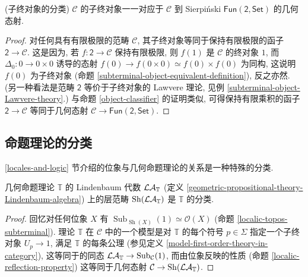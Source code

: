 
\begin{prop}
	[label={subterminal-classifying-topos}]
	{(子终对象的分类\topos{})}
	\topos{} $\mathcal C$ 的子终对象一一对应于 $\mathcal C$ 到 Sierpi\'nski \topos{} $\mathsf {Fun}(\mathsf 2,\mathsf {Set})$ 的几何态射.
\end{prop}
\begin{proof}
	对任何具有有限极限的范畴 $\mathcal C$, 其子终对象等同于保持有限极限的函子 $\mathsf 2\to\mathcal C$. 这是因为, 若 $f\colon \mathsf 2\to\mathcal C$ 保持有限极限, 则 $f(1)$ 是 $\mathcal C$ 的终对象 $1$, 而 $\Delta_0\colon 0\to 0\times 0$ 诱导的态射 $f(0)\to f(0\times 0)\simeq f(0)\times f(0)$ 为同构, 这说明 $f(0)$ 为子终对象 (命题 \ref{subterminal-object-equivalent-definition}), 反之亦然. (另一种看法是范畴 $\mathsf 2$ 等价于子终对象的 Lawvere 理论, 见例 \ref{subterminal-object-Lawvere-theory}.)
	与命题 \ref{object-classifier} 的证明类似, 可得保持有限乘积的函子 $\mathsf 2\to\mathcal C$ 等同于几何态射 $\mathcal C\to\mathsf {Fun}(\mathsf 2,\mathsf {Set})$.
\end{proof}



\subsection{命题理论的分类\topos{}}


\ref{locales-and-logic} 节介绍的位象与几何命题理论的关系是一种特殊的分类\topos{}.

\begin{prop}
	[label={geometric-propositional-theory-classifying-topos}]
	{}
	几何命题理论 $\mathbb T$ 的 Lindenbaum 代数 $\mathcal {LA}_{\mathbb T}$ (定义 \ref{geometric-propositional-theory-Lindenbaum-algebra}) 上的层范畴 $\operatorname{Sh}(\mathcal {LA}_{\mathbb T})$ 是 $\mathbb T$ 的分类\topos{}. %
\end{prop}
\begin{proof}
	回忆对任何位象 $X$ 有 $\operatorname{Sub}_{\operatorname{Sh}(X)}(1)\simeq \mathcal O(X)$ (命题 \ref{localic-topos-subterminal}). 理论 $\mathbb T$ 在\topos{} $\mathcal C$ 中的一个模型是对 $\mathbb T$ 的每个符号 $p\in\Sigma$ 指定一个子终对象 $U_p\to 1$, 满足 $\mathbb T$ 的每条公理 (参见定义 \ref{model-first-order-theory-in-category}), 这等同于\fm{}的同态 $\mathcal {LA}_{\mathbb T}\to\operatorname{Sub}_{\mathcal C}(1)$, 而由位象反映的性质 (命题 \ref{localic-reflection-property}) 这等同于几何态射
	$\mathcal C\to \operatorname{Sh}(\mathcal {LA}_{\mathbb T})$.
\end{proof}

